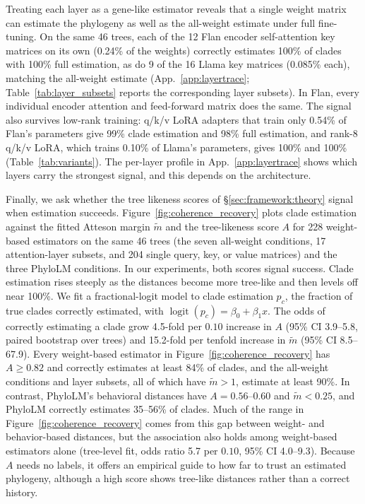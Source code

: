 \documentclass{article}
\theoremstyle{definition}
\theoremstyle{plain}
\newif\ifrevision
\newcommand{\rev}[1]{\ifrevision{\color{blue}#1}\else#1\fi}
\newcommand{\revtag}[1]{\ifrevision\textsuperscript{\color{blue}\sffamily\scriptsize[#1]}\fi}
\begin{document}
Treating each layer as a gene-like estimator reveals that a single weight matrix can estimate the phylogeny as well as the all-weight estimate under full fine-tuning. On the same 46 trees, each of the 12 Flan encoder self-attention key matrices on its own (0.24\% of the weights) correctly estimates 100\% of clades with 100\% full estimation, as do \rev{9}\revtag{Corr.} of the 16 Llama key matrices (0.085\% each), matching the all-weight estimate (App.~\ref{app:layertrace}; Table~\ref{tab:layer_subsets} reports the corresponding layer subsets). In Flan, every individual encoder attention and feed-forward matrix does the same. The signal also survives low-rank training: q/k/v LoRA adapters that train only 0.54\% of Flan's parameters give 99\% clade estimation and 98\% full estimation, and rank-8 q/k/v LoRA, which trains 0.10\% of Llama's parameters, gives 100\% and 100\% (Table~\ref{tab:variants}). The per-layer profile in App.~\ref{app:layertrace} shows which layers carry the strongest signal, and this depends on the architecture.

Finally, we ask whether the tree likeness scores of \S\ref{sec:framework:theory} signal when estimation succeeds. Figure~\ref{fig:coherence_recovery} plots clade estimation against the fitted Atteson margin $\widetilde m$ and the tree-likeness score $A$ for 228 weight-based estimators on the same 46 trees (the seven all-weight conditions, 17 attention-layer subsets, and 204 single query, key, or value matrices) and the three PhyloLM conditions. In our experiments, both scores signal success. Clade estimation rises steeply as the distances become more tree-like and then levels off near 100\%. We fit a fractional-logit model to clade estimation $p_c$, the fraction of true clades correctly estimated, with $\operatorname{logit}(p_c)=\beta_0+\beta_1x$. The odds of correctly estimating a clade grow 4.5-fold per $0.10$ increase in $A$ (95\% CI 3.9--5.8, paired bootstrap over trees) and 15.2-fold per tenfold increase in $\widetilde m$ (95\% CI 8.5--\rev{67.9}\revtag{Corr.}). Every weight-based estimator in Figure~\ref{fig:coherence_recovery} has $A\ge0.82$ and correctly estimates at least 84\% of clades, and the all-weight conditions and layer subsets, all of which have $\widetilde m>1$, estimate at least 90\%. In contrast, PhyloLM's behavioral distances have $A=0.56$--$0.60$ and $\widetilde m<0.25$, and PhyloLM correctly estimates 35--56\% of clades. Much of the range in Figure~\ref{fig:coherence_recovery} comes from this gap between weight- and behavior-based distances, but the association also holds among weight-based estimators alone (tree-level fit, odds ratio 5.7 per $0.10$, 95\% CI 4.0--9.3). Because $A$ needs no labels, it offers an empirical guide to how far to trust an estimated phylogeny, although a high score shows tree-like distances rather than a correct history.
\end{document}
